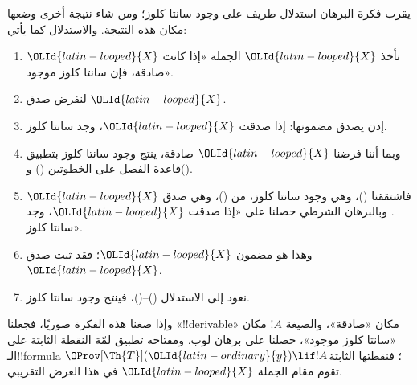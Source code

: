 \documentclass[../../../include/open-logic-section]{subfiles}
\begin{document}
\begin{explain}
يقرب فكرة البرهان استدلال طريف على وجود سانتا كلوز؛ ومن شاء
نتيجة أخرى وضعها مكان هذه النتيجة. والاستدلال كما يأتي:
\begin{enumerate}
\item نأخذ ${\OLId{latin-looped}{X}}$ الجملة «إذا كانت ${\OLId{latin-looped}{X}}$ صادقة، فإن سانتا كلوز موجود».
\item لنفرض صدق ${\OLId{latin-looped}{X}}$.
\item إذن يصدق مضمونها: إذا صدقت ${\OLId{latin-looped}{X}}$، وجد سانتا كلوز.
\item وبما أننا فرضنا ${\OLId{latin-looped}{X}}$ صادقة، ينتج وجود سانتا كلوز بتطبيق
  قاعدة الفصل على الخطوتين () و().
\item فاشتققنا ()، وهي وجود سانتا كلوز، من ()، وهي صدق ${\OLId{latin-looped}{X}}$.
  وبالبرهان الشرطي حصلنا على «إذا صدقت ${\OLId{latin-looped}{X}}$، وجد سانتا كلوز».
\item وهذا هو مضمون ${\OLId{latin-looped}{X}}$؛ فقد ثبت صدق ${\OLId{latin-looped}{X}}$.
\item نعود إلى الاستدلال ()--()، فينتج وجود سانتا كلوز.
\end{enumerate}
وإذا صغنا هذه الفكرة صوريًا، فجعلنا «!!{derivable}» مكان
«صادقة»، والصيغة $!A$ مكان «سانتا كلوز موجود»، حصلنا على برهان
لوب. ومفتاحه تطبيق لمّة النقطة الثابتة على الـ!!{formula}
$\OProv[\Th{T}]({\OLId{latin-ordinary}{y}}) \lif !A$؛ فنقطتها الثابتة تقوم مقام
الجملة ${\OLId{latin-looped}{X}}$ في هذا العرض التقريبي.
\end{explain}
\end{document}
